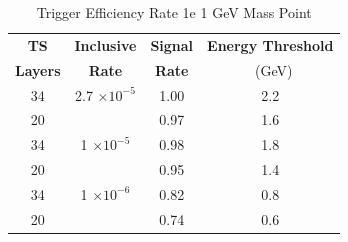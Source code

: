 \begin{table}
 \centering
\caption{Trigger Efficiency Rate 1e 1 GeV Mass Point}
\begin{tabular}{ c | c | c | c }
\textbf{TS} & \textbf{Inclusive} & \textbf{Signal} & \textbf{Energy Threshold}  \\ \textbf{Layers} & \textbf{Rate} & \textbf{Rate} & \ (GeV) \\ 
\hline
34 & 2.7 $\times 10^{-5}$ & 1.00 & 2.2 \\ 
20 & & 0.97 & 1.6 \\ 
\hline 
34 & 1 $\times 10^{-5}$ & 0.98 & 1.8 \\ 
20 & & 0.95 & 1.4 \\ 
\hline 
34 & 1 $\times 10^{-6}$ & 0.82 & 0.8 \\ 
20 & & 0.74 & 0.6 \\ 
\hline 
\end{tabular}
\end{table}

